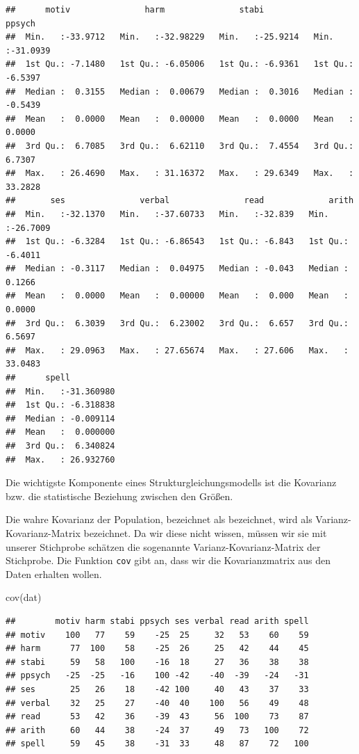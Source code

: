 \documentclass[
]{article}
\newenvironment{Shaded}{\begin{snugshade}}{\end{snugshade}}
\newcommand{\FunctionTok}[1]{\textcolor[rgb]{0.00,0.00,0.00}{#1}}
\newcommand{\NormalTok}[1]{#1}
\begin{document}
\begin{verbatim}
##      motiv               harm               stabi              ppsych        
##  Min.   :-33.9712   Min.   :-32.98229   Min.   :-25.9214   Min.   :-31.0939  
##  1st Qu.: -7.1480   1st Qu.: -6.05006   1st Qu.: -6.9361   1st Qu.: -6.5397  
##  Median :  0.3155   Median :  0.00679   Median :  0.3016   Median : -0.5439  
##  Mean   :  0.0000   Mean   :  0.00000   Mean   :  0.0000   Mean   :  0.0000  
##  3rd Qu.:  6.7085   3rd Qu.:  6.62110   3rd Qu.:  7.4554   3rd Qu.:  6.7307  
##  Max.   : 26.4690   Max.   : 31.16372   Max.   : 29.6349   Max.   : 33.2828  
##       ses               verbal               read             arith         
##  Min.   :-32.1370   Min.   :-37.60733   Min.   :-32.839   Min.   :-26.7009  
##  1st Qu.: -6.3284   1st Qu.: -6.86543   1st Qu.: -6.843   1st Qu.: -6.4011  
##  Median : -0.3117   Median :  0.04975   Median : -0.043   Median :  0.1266  
##  Mean   :  0.0000   Mean   :  0.00000   Mean   :  0.000   Mean   :  0.0000  
##  3rd Qu.:  6.3039   3rd Qu.:  6.23002   3rd Qu.:  6.657   3rd Qu.:  6.5697  
##  Max.   : 29.0963   Max.   : 27.65674   Max.   : 27.606   Max.   : 33.0483  
##      spell           
##  Min.   :-31.360980  
##  1st Qu.: -6.318838  
##  Median : -0.009114  
##  Mean   :  0.000000  
##  3rd Qu.:  6.340824  
##  Max.   : 26.932760
\end{verbatim}

Die wichtigste Komponente eines Strukturgleichungsmodells ist die
Kovarianz bzw. die statistische Beziehung zwischen den Größen.

Die wahre Kovarianz der Population, bezeichnet als bezeichnet, wird als
Varianz-Kovarianz-Matrix bezeichnet. Da wir diese nicht wissen, müssen
wir sie mit unserer Stichprobe schätzen die sogenannte
Varianz-Kovarianz-Matrix der Stichprobe. Die Funktion \texttt{cov} gibt
an, dass wir die Kovarianzmatrix aus den Daten erhalten wollen.

\begin{Shaded}
\begin{Highlighting}[]
\FunctionTok{cov}\NormalTok{(dat)}
\end{Highlighting}
\end{Shaded}

\begin{verbatim}
##        motiv harm stabi ppsych ses verbal read arith spell
## motiv    100   77    59    -25  25     32   53    60    59
## harm      77  100    58    -25  26     25   42    44    45
## stabi     59   58   100    -16  18     27   36    38    38
## ppsych   -25  -25   -16    100 -42    -40  -39   -24   -31
## ses       25   26    18    -42 100     40   43    37    33
## verbal    32   25    27    -40  40    100   56    49    48
## read      53   42    36    -39  43     56  100    73    87
## arith     60   44    38    -24  37     49   73   100    72
## spell     59   45    38    -31  33     48   87    72   100
\end{verbatim}
\end{document}
